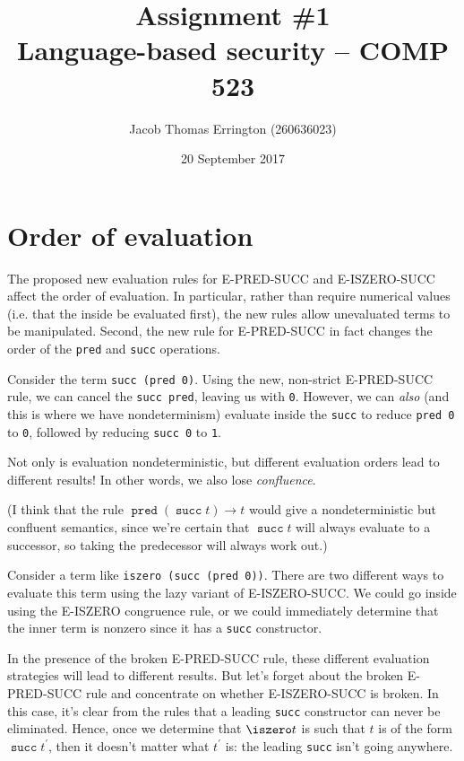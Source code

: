 \documentclass[11pt,letterpaper]{article}
\author{Jacob Thomas Errington (260636023)}
\title{Assignment \#1\\Language-based security -- COMP 523}
\date{20 September 2017}
\begin{document}
\maketitle

\section{Order of evaluation}

The proposed new evaluation rules for E-PRED-SUCC and E-ISZERO-SUCC affect the
order of evaluation. In particular, rather than require numerical values (i.e.
that the inside be evaluated first), the new rules allow unevaluated terms to
be manipulated. Second, the new rule for E-PRED-SUCC in fact changes the order
of the \texttt{pred} and \texttt{succ} operations.

\begin{description}
    \newcommand{\Succ}{\operatorname{\mathtt{succ}}}
    \newcommand{\Pred}{\operatorname{\mathtt{pred}}}
    \item[E-PRED-SUCC.]
        Consider the term \texttt{succ (pred 0)}.
        Using the new, non-strict E-PRED-SUCC rule, we can cancel the
        \texttt{succ pred}, leaving us with \texttt{0}.
        However, we can \emph{also} (and this is where we have nondeterminism)
        evaluate inside the \texttt{succ} to reduce \texttt{pred 0} to
        \texttt{0}, followed by reducing \texttt{succ 0} to \texttt{1}.

        Not only is evaluation nondeterministic, but different evaluation
        orders lead to different results! In other words, we also lose
        \emph{confluence}.

        (I think that the rule $\Pred (\Succ t) \to t$  would give a
        nondeterministic but confluent semantics, since we're certain that
        $\Succ t$ will always evaluate to a successor, so taking the
        predecessor will always work out.)

    \item[E-ISZERO-SUCC.]
        Consider a term like \texttt{iszero (succ (pred 0))}.
        There are two different ways to evaluate this term using the lazy
        variant of E-ISZERO-SUCC. We could go inside using the E-ISZERO
        congruence rule, or we could immediately determine that the inner term
        is nonzero since it has a \texttt{succ} constructor.

        In the presence of the broken E-PRED-SUCC rule, these different
        evaluation strategies will lead to different results. But let's forget
        about the broken E-PRED-SUCC rule and concentrate on whether
        E-ISZERO-SUCC is broken. In this case, it's clear from the rules that
        a leading \texttt{succ} constructor can never be eliminated. Hence,
        once we determine that $\iszero t$ is such that $t$ is of
        the form $\Succ t^\prime$, then it doesn't matter what $t^\prime$ is:
        the leading \texttt{succ} isn't going anywhere.


\end{description}
\end{document}
